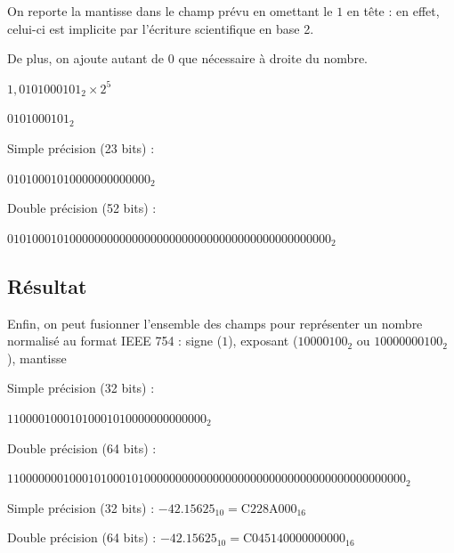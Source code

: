 \documentclass[11pt,a4paper]{article}
\begin{document}
\medskip

On reporte la mantisse dans le champ prévu en omettant le $ 1 $ en tête : en effet, celui-ci est implicite par l'écriture scientifique en base 2.

De plus, on ajoute autant de $ 0 $ que nécessaire à droite du nombre.

\medskip

$ 1,0101000101_{2} \times 2^{5} $

\medskip

$ 0101000101_{2} $

\medskip

Simple précision (23 bits) :

$ 0101 0001 0100 0000 0000 000_{2} $

\medskip

Double précision (52 bits) :

$ 0101 0001 0100 0000 0000 0000 0000 0000 0000 0000 0000 0000 0000_{2} $

\bigskip

\subsection{Résultat}

\bigskip

Enfin, on peut fusionner l'ensemble des champs pour représenter un nombre normalisé au format IEEE 754 : signe ($ 1 $), exposant ($ 1000 0100_{2} $ ou $ 100 0000 0100_{2} $), mantisse

\medskip


Simple précision (32 bits) :

$ 1 1000 0100 0101 0001 0100 0000 0000 000_{2} $

\medskip

Double précision (64 bits) :

$ 1 100 0000 0100 0101 0001 0100 0000 0000 0000 0000 0000 0000 0000 0000 0000 0000_{2} $


\bigskip


Simple précision (32 bits) : $ -42.15625_{10} = \text{C}228\text{A}000_{16} $

\medskip

Double précision (64 bits) : $ -42.15625_{10} = \text{C}045140000000000_{16} $


\end{document}
